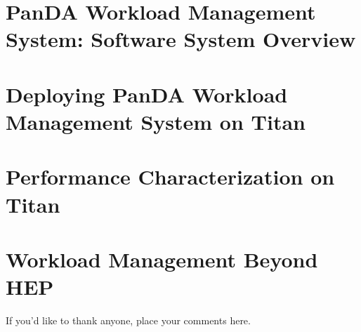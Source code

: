 \documentclass[smallextended]{svjour3}      %
\begin{document}

\section{PanDA Workload Management System: Software System Overview}
\label{sec:overview}



\section{Deploying PanDA Workload Management System on Titan}
\label{sec:deploying}



\section{Performance Characterization on Titan}
\label{sec:performance}



\section{Workload Management Beyond HEP}
\label{sec:beyond_hep}



\begin{acknowledgements}
    If you'd like to thank anyone, place your comments here.
\end{acknowledgements}





\end{document}
